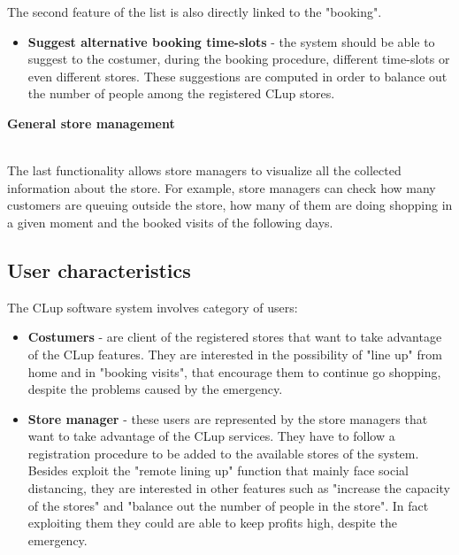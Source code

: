 \documentclass[]{article}
\begin{document}
The second feature of the list is also directly linked to the "booking".
\begin{itemize}
	\renewcommand{\labelitemi}{$-$}
	\item \textbf{Suggest alternative booking time-slots} - the system should be able to suggest to the costumer, during the booking procedure, different time-slots or even different stores. These suggestions are computed in order to balance out the number of people among the registered CLup stores.
\end{itemize}
\bigskip
\begin{large}
	\textbf{General store management}
\end{large}
\smallskip
\\
The last functionality allows store managers to visualize all the collected information about the store. For example, store managers can check how many customers are queuing outside the store, how many of them are doing shopping in a given moment and the booked visits of the following days.  

\newpage

\subsection{User characteristics}
The CLup software system involves category of users:
\begin{itemize}
	\renewcommand{\labelitemi}{$-$}
	\item \textbf{Costumers} - are client of the registered stores that want to take advantage of the CLup features. They are interested in the possibility of "line up" from home and in "booking visits", that encourage them to continue go shopping, despite the problems caused by the emergency.
	
	\item \textbf{Store manager} - these users are represented by the store managers that want to take advantage of the CLup services. They have to follow a registration procedure to be added to the available stores of the system. 
	\\Besides exploit the "remote lining up" function that mainly face social distancing, they are interested in other features such as "increase the capacity of the stores" and "balance out the number of people in the store". In fact exploiting them they could are able to keep profits high, despite the emergency. 		
\end{itemize}

\bigskip
\end{document}
